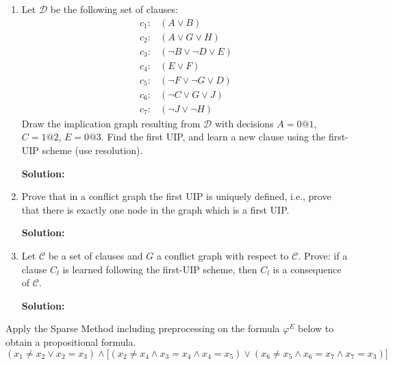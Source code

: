\documentclass[11pt,a4paper]{uebung}
\newcommand{\solution}[1]{\par {\bf Solution:}\\#1}
\begin{document}

\newpage
{}
\begin{enumerate}
\item Let $\mathcal{D}$ be the following set of clauses:
  \begin{align*}
    c_1:& (A \lor B)\\
    c_2:& (A \lor G \lor H)\\
    c_3:& (\neg B \lor \neg D \lor E)\\
    c_4:& (E \lor F)\\
    c_5:& (\neg F \lor \neg G \lor D)\\
    c_6:& (\neg C \lor G \lor J)\\
    c_7:& (\neg J \lor \neg H)
  \end{align*}
  Draw the implication graph resulting from $\mathcal{D}$ with decisions
  $A=0@1$, $C=1@2$, $E=0@3$. Find the first UIP, and learn a new clause using
  the first-UIP scheme (use resolution).

  \solution{
  }

\item Prove that in a conflict graph the first UIP is uniquely defined, i.e.,
  prove that there is exactly one node in the graph which is a first UIP.

  \solution{
  }

\item Let $\mathcal{C}$ be a set of clauses and $G$ a conflict graph with
  respect to $\mathcal{C}$. Prove: if a clause $C_l$ is learned following the
  first-UIP scheme, then $C_l$ is a consequence of $\mathcal{C}$.

  \solution{
  }
\end{enumerate}



\newpage
{}
Apply the Sparse Method including preprocessing on the formula $\varphi^E$
below to obtain a propositional formula.
\begin{displaymath}
  (x_1 \neq x_2 \lor x_2=x_3 ) \land \big[ (x_2 \neq x_4 \land x_3=x_4
  \land x_4=x_5)
  \lor (x_6 \neq x_5 \land x_6=x_7 \land x_7=x_3)\big]
\end{displaymath}
\end{document}
